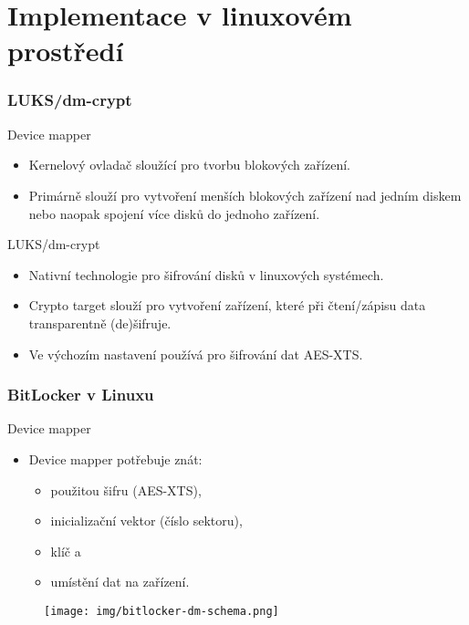 \documentclass{beamer}
\begin{document}

\section{Implementace v linuxovém prostředí}

\begin{frame}
	\frametitle{LUKS/dm-crypt}

	\begin{block}{Device mapper}
		\begin{itemize}
			\item Kernelový ovladač sloužící pro tvorbu  blokových zařízení.
			\item Primárně slouží pro vytvoření menších blokových zařízení nad jedním diskem nebo naopak spojení více disků do jednoho zařízení.
		\end{itemize}
	\end{block}
	
	

\vspace{0.5cm}

	\begin{block}{LUKS/dm-crypt}
		\begin{itemize}
			\item Nativní technologie pro šifrování disků v linuxových systémech.
			\item Crypto target slouží pro vytvoření zařízení, které při čtení/zápisu data transparentně (de)šifruje.
			\item Ve výchozím nastavení používá pro šifrování dat AES-XTS.
		\end{itemize}
	\end{block}

\end{frame}

\begin{frame}
	\frametitle{BitLocker v Linuxu}

	\begin{block}{Device mapper}
		\begin{itemize}
			\item Device mapper potřebuje znát:
			\begin{itemize}
				\item použitou šifru (AES-XTS),
				\item inicializační vektor (číslo sektoru),
				\item klíč a
				\item umístění dat na zařízení.
			\end{itemize}
		\end{itemize}
	\end{block}
	
\begin{figure}[ht!]
	\begin{center}
  	  \texttt{[image: img/bitlocker-dm-schema.png]}
	\end{center}
	\end{figure}

\end{frame}
\end{document}
